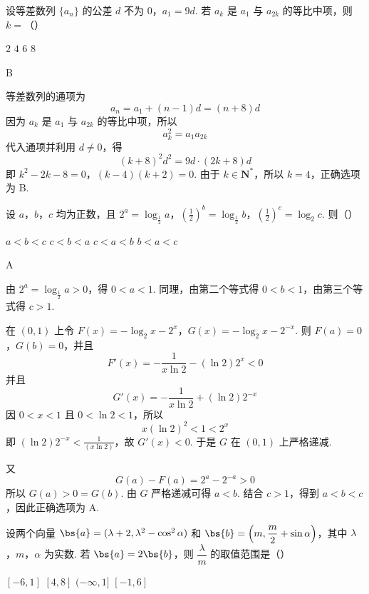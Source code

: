 \begin{problem}
设等差数列 \(\{a_{n}\}\) 的公差 \(d\) 不为 0，\(a_{1} = 9d\). 若 \(a_{k}\) 是 \(a_{1}\) 与 \(a_{2k}\) 的等比中项，则 \(k =\)（\quad）

\choices
    {\(2\)}
    {\(4\)}
    {\(6\)}
    {\(8\)}
\end{problem}

\begin{answer}
B
\end{answer}

\begin{solution}
等差数列的通项为
\[
a_n=a_1+(n-1)d=(n+8)d
\]
因为 \(a_k\) 是 \(a_1\) 与 \(a_{2k}\) 的等比中项，所以
\[
a_k^2=a_1a_{2k}
\]
代入通项并利用 \(d\ne0\)，得
\[
(k+8)^2d^2=9d\cdot(2k+8)d
\]
即
\(k^2-2k-8=0\)，\((k-4)(k+2)=0\).
由于 \(k\in\mathbf N^*\)，所以 \(k=4\)，正确选项为 B.
\end{solution}

\begin{problem}
设 \(a\)，\(b\)，\(c\) 均为正数，且 \(2^{a} = \log_{\frac{1}{2}} a\)，\(\left(\frac{1}{2}\right)^{b} = \log_{\frac{1}{2}} b\)，\(\left(\frac{1}{2}\right)^{c} = \log_{2} c\). 则（\quad）

\choices
    {\(a < b < c\)}
    {\(c < b < a\)}
    {\(c < a < b\)}
    {\(b < a < c\)}
\end{problem}

\begin{answer}
A
\end{answer}

\begin{solution}
由 \(2^a=\log_{\frac{1}{2}}a>0\)，得 \(0<a<1\). 同理，由第二个等式得 \(0<b<1\)，由第三个等式得 \(c>1\).

在 \((0,1)\) 上令 \(F(x)=-\log_2x-2^x\)，\(G(x)=-\log_2x-2^{-x}\).
则 \(F(a)=0\)，\(G(b)=0\)，并且
\[
F'(x)=-\frac{1}{x\ln2}-(\ln2)2^x<0
\]
并且
\[
G'(x)=-\frac{1}{x\ln2}+(\ln2)2^{-x}
\]
因 \(0<x<1\) 且 \(0<\ln2<1\)，所以
\[
x(\ln2)^2<1<2^x
\]
即 \((\ln2)2^{-x}<\frac{1}{(x\ln2)}\)，故 \(G'(x)<0\). 于是 \(G\) 在 \((0,1)\) 上严格递减.

又
\[
G(a)-F(a)=2^a-2^{-a}>0
\]
所以 \(G(a)>0=G(b)\). 由 \(G\) 严格递减可得 \(a<b\). 结合 \(c>1\)，得到 \(a<b<c\)，因此正确选项为 A.
\end{solution}

\begin{problem}
设两个向量 \(\bs{a} = (\lambda + 2, \lambda^2 - \cos^2 \alpha)\) 和 \(\bs{b} = \left(m, \dfrac{m}{2} + \sin \alpha\right)\)，其中 \(\lambda\)，\(m\)，\(\alpha\) 为实数. 若 \(\bs{a} = 2\bs{b}\)，则 \(\dfrac{\lambda}{m}\) 的取值范围是（\quad）

\choices
    {\([-6, 1]\)}
    {\([4, 8]\)}
    {\((-\infty, 1]\)}
    {\([-1, 6]\)}
\end{problem}

